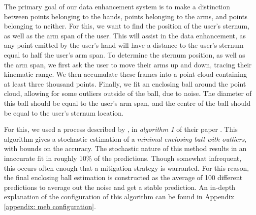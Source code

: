 The primary goal of our data enhancement system is to make a distinction between points belonging to the hands, points belonging to the arms, and points belonging to neither.
For this, we want to find the position of the user's sternum, as well as the arm span of the user.
This will assist in the data enhancement, as any point emitted by the user's hand will have a distance to the user's sternum equal to half the user's arm span.
To determine the sternum position, as well as the arm span, we first ask the user to move their arms up and down, tracing their kinematic range.
We then accumulate these frames into a point cloud containing at least three thousand points.
Finally, we fit an enclosing ball around the point cloud, allowing for some outliers outside of the ball, due to noise.
The diameter of this ball should be equal to the user's arm span, and the centre of the ball should be equal to the user's sternum location.




For this, we used a process described by \citeauthor{ding2020sublinear}, in \textit{algorithm 1} of their paper \cite{ding2020sublinear}.
This algorithm gives a stochastic estimation of a \textit{minimal enclosing ball with outliers}, with bounds on the accuracy.
The stochastic nature of this method results in an inaccurate fit in roughly 10\% of the predictions.
Though somewhat infrequent, this occurs often enough that a mitigation strategy is warranted.
For this reason, the final enclosing ball estimation is constructed as the average of 100 different predictions to average out the noise and get a stable prediction.
An in-depth explanation of the configuration of this algorithm can be found in Appendix \ref{appendix: meb configuration}.

